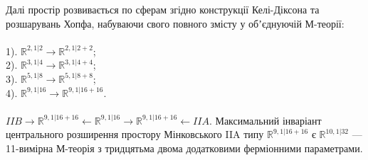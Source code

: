 Далі простір розвивається по сферам згідно конструкції Келі-Діксона
та розшарувань Хопфа, набуваючи свого повного змісту у обʼєднуючій М-теорії:
\\
\\
1). $\mathbb{R}^{2,1|2} \rightarrow \mathbb{R}^{2,1|2+2}$;\\
2). $\mathbb{R}^{3,1|4} \rightarrow \mathbb{R}^{3,1|4+4}$;\\
3). $\mathbb{R}^{5,1|8} \rightarrow \mathbb{R}^{5,1|8+8}$;\\
4). $\mathbb{R}^{9,1|16} \rightarrow \mathbb{R}^{9,1|16+16}$.\\
\\
$IIB \rightarrow \mathbb{R}^{9,1|16+16} \leftarrow \mathbb{R}^{9,1|16} \rightarrow \mathbb{R}^{9,1|16+16} \leftarrow IIA$.
Максимальний інваріант центрального розширення простору
Мінковського IIA типу $\mathbb{R}^{9,1|16+16}$ є $\mathbb{R}^{10,1|32}$ --- 11-вимірна
М-теорія з тридцятьма двома додатковими ферміонними параметрами.
